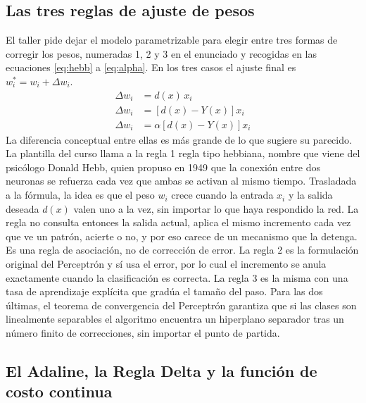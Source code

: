 \documentclass[11pt,letterpaper]{article}
\begin{document}
\subsection{Las tres reglas de ajuste de pesos}

El taller pide dejar el modelo parametrizable para elegir entre tres formas de corregir los pesos, numeradas 1, 2 y 3 en el enunciado y recogidas en las ecuaciones \eqref{eq:hebb} a \eqref{eq:alpha}. En los tres casos el ajuste final es $w_i^{*} = w_i + \Delta w_i$.
\begin{align}
    \Delta w_i &= d(x)\, x_i \label{eq:hebb} \\
    \Delta w_i &= \left[d(x) - Y(x)\right] x_i \label{eq:perc} \\
    \Delta w_i &= \alpha \left[d(x) - Y(x)\right] x_i \label{eq:alpha}
\end{align}
La diferencia conceptual entre ellas es más grande de lo que sugiere su parecido. La plantilla del curso llama a la regla 1 regla tipo hebbiana, nombre que viene del psicólogo Donald Hebb, quien propuso en 1949 que la conexión entre dos neuronas se refuerza cada vez que ambas se activan al mismo tiempo. Trasladada a la fórmula, la idea es que el peso $w_i$ crece cuando la entrada $x_i$ y la salida deseada $d(x)$ valen uno a la vez, sin importar lo que haya respondido la red. La regla no consulta entonces la salida actual, aplica el mismo incremento cada vez que ve un patrón, acierte o no, y por eso carece de un mecanismo que la detenga. Es una regla de asociación, no de corrección de error. La regla 2 es la formulación original del Perceptrón y sí usa el error, por lo cual el incremento se anula exactamente cuando la clasificación es correcta. La regla 3 es la misma con una tasa de aprendizaje explícita que gradúa el tamaño del paso. Para las dos últimas, el teorema de convergencia del Perceptrón garantiza que si las clases son linealmente separables el algoritmo encuentra un hiperplano separador tras un número finito de correcciones, sin importar el punto de partida.

\subsection{El Adaline, la Regla Delta y la función de costo continua}
\end{document}
